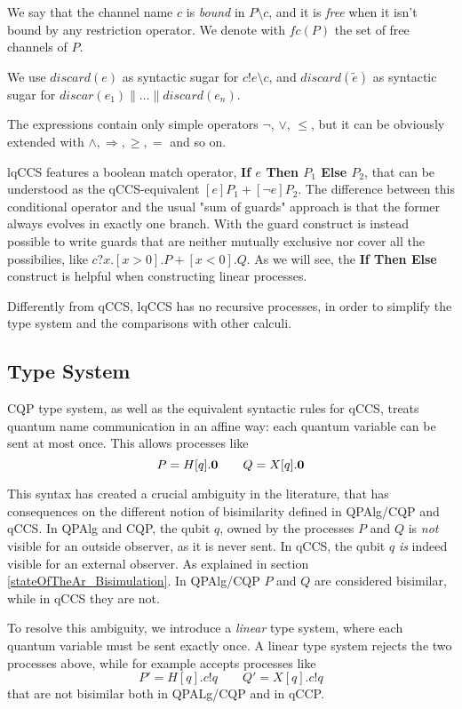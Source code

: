 We say that the channel name $c$ is \textit{bound} in $P\setminus c$, and it is \textit{free} when it isn't bound by any restriction operator. We denote with $fc(P)$ the set of free channels of $P$.

We use $discard(e)$ as syntactic sugar for $c!e \setminus c$, and $discard(\widetilde{e})$ as syntactic sugar for $discar(e_1)\parallel \ldots\parallel discard(e_n)$.

The expressions contain only simple operators $\neg$, $\vee$, $\leq$, but it can be obviously extended with $\wedge, \Rightarrow, \geq, =$ and so on.

lqCCS features a boolean match operator, \textbf{If $e$ Then $P_1$ Else $P_2$}, that can be understood as the qCCS-equivalent $[e]P_1 + [\neg e]P_2$. The difference between this conditional operator and the usual "sum of guards" approach is that the former always evolves in exactly one branch. With the guard construct is instead possible to write guards that are neither mutually exclusive nor cover all the possibilies, like $c?x.[x > 0].P + [x < 0].Q$. As we will see, the  \textbf{If Then Else} construct is helpful when constructing linear processes.

Differently from qCCS, lqCCS has no recursive processes, in order to simplify the type system and the comparisons with other calculi.


\subsection{Type System}

CQP type system, as well as the equivalent syntactic rules for qCCS, treats quantum name communication in an affine way: each quantum variable can be sent at most once. This allows processes like 
\[ P = H[q].\mathbf{0} \qquad Q = X[q].\mathbf{0}\]

This syntax has created a crucial ambiguity in the literature, that has consequences on the different notion of bisimilarity defined in QPAlg/CQP and qCCS. In QPAlg and CQP, the qubit $q$, owned by the processes $P$ and $Q$ is \textit{not} visible for an outside observer, as it is never sent. In qCCS, the qubit $q$ \textit{is} indeed visible for an external observer. As explained in section \ref{stateOfTheAr_Bisimulation}. In QPAlg/CQP $P$ and $Q$ are considered bisimilar, while in qCCS they are not.

To resolve this ambiguity, we introduce a \textit{linear} type system, where each quantum variable must be sent exactly once. A linear type system rejects the two processes above, while for example accepts processes like
\[P' = H[q].c!q \qquad Q' = X[q].c!q\]
that are not bisimilar both in QPALg/CQP and in qCCP.


